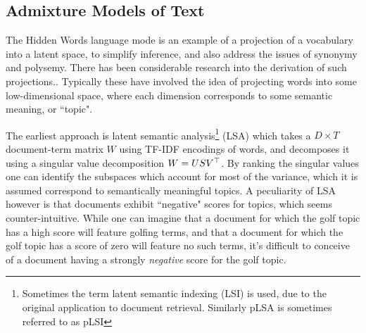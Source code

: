 

\subsection{Admixture Models of Text}
The Hidden Words language mode is an example of a projection of a vocabulary into a latent space, to simplify inference, and also address the issues of synonymy and polysemy. There has been considerable research into the derivation of such projections.. Typically these have involved the idea of projecting words into some low-dimensional space, where each dimension corresponds to some semantic meaning, or ``topic". 

The earliest approach is latent semantic analysis\footnote{Sometimes the term latent semantic indexing (LSI) is used, due to the original application to document retrieval. Similarly pLSA is sometimes referred to as pLSI} (LSA)\cite{Deerwester1990} which takes a $D\times T$ document-term matrix $W$ using TF-IDF encodings of words, and decomposes it using a singular value decomposition $W = USV^\top$. By ranking the singular values one can identify the subspaces which account for most of the variance, which it is assumed correspond to semantically meaningful topics. A peculiarity of LSA however is that documents exhibit ``negative" scores for topics, which seems counter-intuitive. While one can imagine that a document for which the golf topic has a high score will feature golfing terms, and that a document for which the golf topic has a score of zero will feature no such terms, it's difficult to conceive of a document having a strongly \emph{negative} score for the golf topic.


